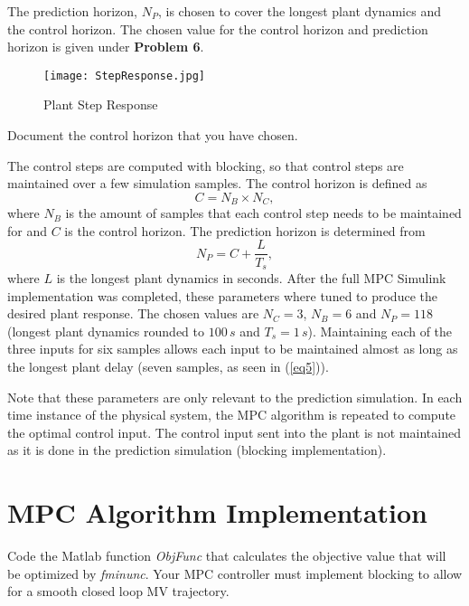 \documentclass[12pt]{article}
\newenvironment{problem}[2][Problem]{\begin{trivlist}
		\item[\hskip \labelsep {\bfseries #1}\hskip \labelsep {\bfseries #2.}]}{\end{trivlist}}
\begin{document}
The prediction horizon, $N_P$, is chosen to cover the longest plant dynamics and the control horizon. The chosen value for the control horizon and prediction horizon is given under \textbf{Problem 6}.

\begin{figure}[h!]
	\texttt{[image: StepResponse.jpg]}
	\centering
	\caption{Plant Step Response}
	\label{fig:StepResponse}
\end{figure}

\begin{problem}{6} Document the control horizon that you have chosen. \end{problem}

The control steps are computed with blocking, so that control steps are maintained over a few simulation samples. The control horizon is defined as
\begin{equation}
C = N_B \times N_C,
\end{equation}
where $N_B$ is the amount of samples that each control step needs to be maintained for and $C$ is the control horizon. The prediction horizon is determined from
\begin{equation}
N_P = C + \frac{L}{T_s},
\end{equation}
where $L$ is the longest plant dynamics in seconds. After the full MPC Simulink implementation was completed, these parameters where tuned to produce the desired plant response. The chosen values are $N_C=3$, $N_B=6$ and $N_P=118$ (longest plant dynamics rounded to $100 \,s$ and $T_s=1 \,s$). Maintaining each of the three inputs for six samples allows each input to be maintained almost as long as the longest plant delay (seven samples, as seen in (\ref{eq5})). %

Note that these parameters are only relevant to the prediction simulation. In each time instance of the physical system, the MPC algorithm is repeated to compute the optimal control input. The control input sent into the plant is not maintained as it is done in the prediction simulation (blocking implementation). %

\section{MPC Algorithm Implementation}
\label{code:mpcimplementation}

\begin{problem}{7} Code the Matlab function \textit{ObjFunc} that calculates the objective value that will be optimized by \textit{fminunc}. Your MPC controller must implement blocking to allow for a smooth closed loop MV trajectory. \end{problem}
\end{document}
